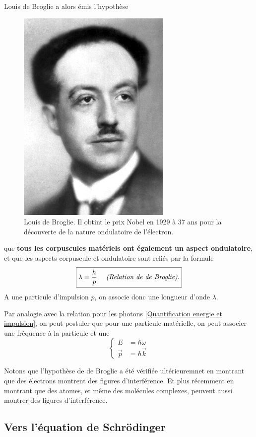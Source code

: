 \documentclass{book}
\begin{document}
Louis de Broglie a alors émis l'hypothèse 
\begin{figure}
\includegraphics[width=0.3\linewidth]{images/Louis_de_Broglie}
\caption{Louis de Broglie. Il obtint le prix Nobel en 1929 à 37 ans pour la découverte de la nature ondulatoire de l'électron.}
\end{figure}
que \textbf{tous les corpuscules matériels ont également un aspect ondulatoire}, et que les aspects corpuscule et ondulatoire sont reliés par la formule 
\begin{equation} \label{eq:debroglie}
\boxed{
 \lambda = \frac{h}{p} \quad \text{ \textit{(Relation de de Broglie).}}} 
\end{equation}
A une particule d'impulsion $p$, on associe donc une longueur d'onde $\lambda$.

Par analogie avec la relation pour les photons \eqref{Quantification energie et impulsion}, on peut postuler que pour une particule matérielle, on peut associer une fréquence à la particule et une
\begin{equation} \label{eq:debroglie}
\boxed{
\left\{ \begin{array}{ll}
E &= \hbar \omega \\
\vec p &= \hbar \vec k
\end{array} \right. } 
\end{equation}


Notons que l'hypothèse de de Broglie a été vérifiée ultérieuremnet en montrant que des électrons montrent des figures d'interférence. Et plus récemment en montrant que des atomes, et même des molécules complexes, peuvent aussi montrer des figures d'interférence.



\subsection{Vers l'équation de Schrödinger}
\end{document}
